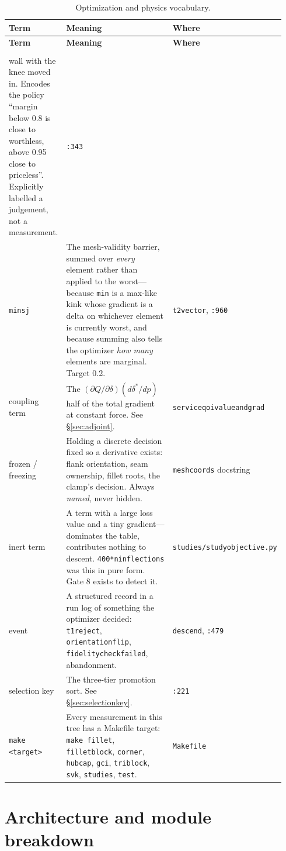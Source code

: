 \documentclass[11pt,a4paper]{article}
\makeatletter
\DeclareRobustCommand{\code}[1]{%
  \texttt{\small\def\_{\textunderscore\discretionary{}{}{}}#1}}
\newenvironment{termtable}[1]
  {\small\begin{longtable}{@{}>{\raggedright\arraybackslash}p{0.19\linewidth}
                             >{\raggedright\arraybackslash}p{0.54\linewidth}
                             >{\raggedright\arraybackslash}p{0.21\linewidth}@{}}
   \caption{#1}\\
   \toprule
   \textbf{Term} & \textbf{Meaning} & \textbf{Where} \\
   \midrule
   \endfirsthead
   \toprule
   \textbf{Term} & \textbf{Meaning} & \textbf{Where} \\
   \midrule
   \endhead
   \midrule
   \multicolumn{3}{r@{}}{\emph{continued on the next page}}\\
   \endfoot
   \bottomrule
   \endlastfoot}
  {\end{longtable}}
\makeatother
\begin{document}
\begin{termtable}{Optimization and physics vocabulary.}
  wall with the knee moved in. Encodes the policy ``margin below 0.8 is close to
  worthless, above 0.95 close to priceless''. Explicitly labelled a judgement, not a
  measurement. &
  \code{:343} \\
\addlinespace
\code{min\_sj} &
  The mesh-validity barrier, summed over \emph{every} element rather than applied to
  the worst---because \code{min} is a max-like kink whose gradient is a delta on
  whichever element is currently worst, and because summing also tells the optimizer
  \emph{how many} elements are marginal. Target 0.2. &
  \code{t2\_vector}, \code{:960} \\
\addlinespace
coupling term &
  The $(\partial Q/\partial\delta)(d\delta^*/dp)$ half of the total gradient at constant
  force. See \S\ref{sec:adjoint}. &
  \code{service\_qoi\_value\_and\_grad} \\
\addlinespace
frozen / freezing &
  Holding a discrete decision fixed so a derivative exists: flank orientation, seam
  ownership, fillet roots, the clamp's decision. Always \emph{named}, never hidden. &
  \code{mesh\_coords} docstring \\
\addlinespace
inert term &
  A term with a large loss value and a tiny gradient---dominates the table, contributes
  nothing to descent. \code{400*n\_inflections} was this in pure form. Gate 8 exists to
  detect it. &
  \code{studies/study\_objective.py} \\
\addlinespace
event &
  A structured record in a run log of something the optimizer decided:
  \code{t1\_reject}, \code{orientation\_flip}, \code{fidelity\_check\_failed},
  abandonment. &
  \code{descend}, \code{:479} \\
\addlinespace
selection key &
  The three-tier promotion sort. See \S\ref{sec:selectionkey}. &
  \code{:221} \\
\addlinespace
\code{make <target>} &
  Every measurement in this tree has a Makefile target: \code{make fillet},
  \code{filletblock}, \code{corner}, \code{hubcap}, \code{gci}, \code{triblock},
  \code{svk}, \code{studies}, \code{test}. &
  \code{Makefile} \\
\end{termtable}

\section{Architecture and module breakdown}
\label{sec:arch}
\end{document}
